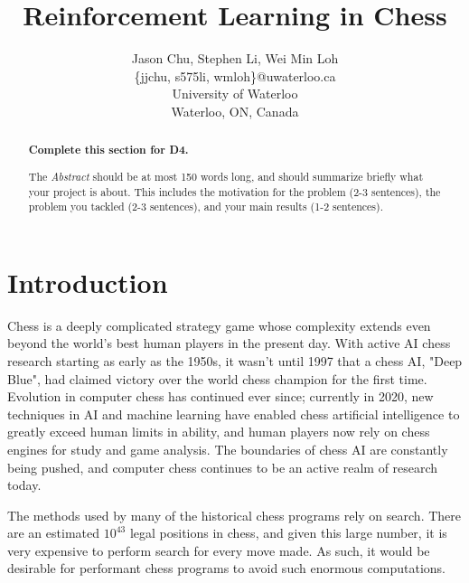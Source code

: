 \documentclass[letterpaper]{article} %
\begin{document}
%
\title{Reinforcement Learning in Chess}
\author{Jason Chu, Stephen Li, Wei Min Loh\\
\{jjchu, s575li, wmloh\}@uwaterloo.ca\\
University of Waterloo\\
Waterloo, ON, Canada\\
}
\maketitle


\begin{abstract}
{\bf Complete this section for D4.}

The {\it Abstract} should be at most 150 words long, and should summarize briefly what your project is about.  This includes the motivation for the problem (2-3 sentences), the problem you tackled (2-3 sentences), and your main results (1-2 sentences).   
\end{abstract}


\section{Introduction} 

Chess is a deeply complicated strategy game whose complexity extends even beyond the world's best human players in the present day. With active AI chess research starting as early as the 1950s, it wasn't until 1997 that a chess AI, "Deep Blue", had claimed victory over the world chess champion for the first time. Evolution in computer chess has continued ever since; currently in 2020, new techniques in AI and machine learning have enabled chess artificial intelligence to greatly exceed human limits in ability, and human players now rely on chess engines for study and game analysis. The boundaries of chess AI are constantly being pushed, and computer chess continues to be an active realm of research today.

The methods used by many of the historical chess programs rely on search. There are an estimated $10^{43}$ legal positions in chess, and given this large number, it is very expensive to perform search for every move made. As such, it would be desirable for performant chess programs to avoid such enormous computations.
\end{document}
